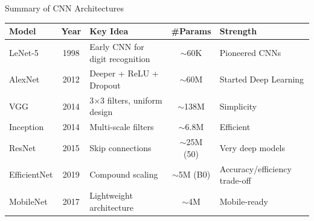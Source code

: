 \begin{frame}{Summary of CNN Architectures}
    \centering
    \small
    \setlength{\tabcolsep}{4pt}
    \begin{tabular}{|l|c|l|c|l|}
        \hline
        \textbf{Model} & \textbf{Year} & \textbf{Key Idea} & \textbf{\#Params} & \textbf{Strength} \\
        \hline
        LeNet-5 & 1998 & Early CNN for digit recognition & $\sim$60K & Pioneered CNNs \\
        AlexNet & 2012 & Deeper + ReLU + Dropout & $\sim$60M & Started Deep Learning \\
        VGG & 2014 & 3$\times$3 filters, uniform design & $\sim$138M & Simplicity \\
        Inception & 2014 & Multi-scale filters & $\sim$6.8M & Efficient \\
        ResNet & 2015 & Skip connections & $\sim$25M (50) & Very deep models \\
        EfficientNet & 2019 & Compound scaling & $\sim$5M (B0) & Accuracy/efficiency trade-off \\
        MobileNet & 2017 & Lightweight architecture & $\sim$4M & Mobile-ready \\
        \hline
    \end{tabular}
\end{frame}